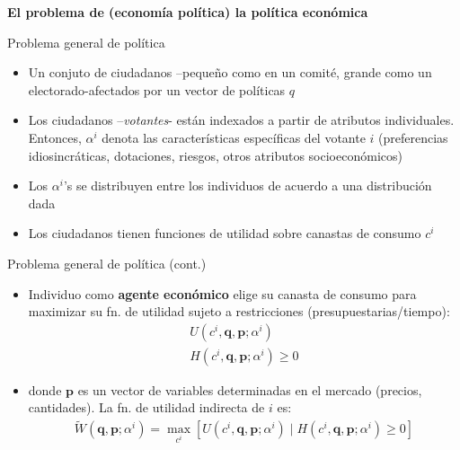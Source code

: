 \documentclass[
  ignorenonframetext,
]{beamer}
\providecommand{\tightlist}{%
  \setlength{\itemsep}{0pt}\setlength{\parskip}{0pt}}\usepackage{longtable,booktabs,array}
\begin{document}
\begin{frame}{\textbf{El problema de (economía política) la política
económica}}
\begin{block}{Problema general de política}
\protect\hypertarget{problema-general-de-poluxedtica}{}
\begin{itemize}
\tightlist
\item
  Un conjuto de ciudadanos --pequeño como en un comité, grande como un
  electorado-afectados por un vector de políticas \textbf{\(q\)}
\item
  Los ciudadanos --\emph{votantes}- están indexados a partir de
  atributos individuales. Entonces, \(\alpha^{i}\) denota las
  características específicas del votante \(i\) (preferencias
  idiosincráticas, dotaciones, riesgos, otros atributos socioeconómicos)
\item
  Los \(\alpha^{i}\)'s se distribuyen entre los individuos de acuerdo a
  una distribución dada
\item
  Los ciudadanos tienen funciones de utilidad sobre canastas de consumo
  \(c^{i}\)
\end{itemize}
\end{block}

\begin{block}{Problema general de política (cont.)}
\protect\hypertarget{problema-general-de-poluxedtica-cont.}{}
\begin{itemize}
\tightlist
\item
  Individuo como \textbf{agente económico} elige su canasta de consumo
  para maximizar su fn. de utilidad sujeto a restricciones
  (presupuestarias/tiempo): \[\begin{aligned}
  U(c^{i},\mathbf{q},\mathbf{p};\alpha^{i}) \\
  H(c^{i},\mathbf{q},\mathbf{p};\alpha^{i}) \geq 0
  \end{aligned}\]
\item
  donde \(\mathbf{p}\) es un vector de variables determinadas en el
  mercado (precios, cantidades). La fn. de utilidad indirecta de \(i\)
  es: \[\begin{aligned}
  \tilde{W}(\mathbf{q},\mathbf{p};\alpha^{i})=\max_{c^{i}}[U(c^{i},\mathbf{q},\mathbf{p};\alpha^{i})\mid H(c^{i},\mathbf{q},\mathbf{p};\alpha^{i})  \geq 0]
  \end{aligned}\]
\end{itemize}
\end{block}


\end{frame}
\end{document}
